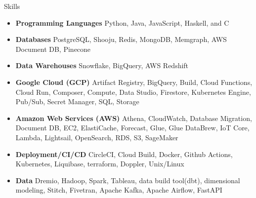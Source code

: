 \documentclass[]{ahmedamrcv}
\begin{document}
        \begin{cvsection}{Skills}
		\begin{cvsubsection}{}{}{}	
			\begin{itemize}
				\item \textbf{Programming Languages} Python, Java, JavaScript, Haskell, and C
                    \item \textbf{Databases} PostgreSQL, Shooju, Redis, MongoDB, Memgraph, AWS Document DB, Pinecone
                    \item \textbf{Data Warehouses} Snowflake, BigQuery, AWS Redshift 
				\item \textbf{Google Cloud (GCP)} Artifact Registry, BigQuery, Build, Cloud Functions, Cloud Run, Composer, Compute, Data Studio, Firestore, Kubernetes Engine, Pub/Sub, Secret Manager, SQL, Storage
                    \item \textbf{Amazon Web Services (AWS)} Athena, CloudWatch, Database Migration, Document DB, EC2, ElastiCache, Forecast, Glue, Glue DataBrew, IoT Core, Lambda, Lightsail, OpenSearch, RDS, S3, SageMaker
				\item \textbf{Deployment/CI/CD} CircleCI, Cloud Build, Docker, Github Actions, Kubernetes, Liquibase, terraform, Doppler, Unix/Linux
				\item \textbf{Data} Dremio, Hadoop, Spark, Tableau, data build tool(dbt), dimensional modeling, Stitch, Fivetran, Apache Kafka, Apache Airflow, FastAPI
			\end{itemize}
		\end{cvsubsection}
        \end{cvsection}
        
\end{document}
